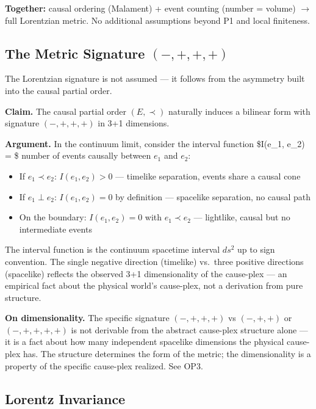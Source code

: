 \documentclass[11pt]{article}
\providecommand{\tightlist}{\setlength{\itemsep}{0pt}\setlength{\parskip}{0pt}}
\theoremstyle{definition}
\theoremstyle{remark}
\begin{document}
\textbf{Together:} causal ordering (Malament) + event counting (number =
volume) \(\to\) full Lorentzian metric. No additional assumptions beyond
P1 and local finiteness.

\subsection{\texorpdfstring{The Metric Signature
\((-,+,+,+)\)}{The Metric Signature (-,+,+,+)}}\label{the-metric-signature--}

The Lorentzian signature is not assumed --- it follows from the
asymmetry built into the causal partial order.

\textbf{Claim.} The causal partial order \((E, \prec)\) naturally
induces a bilinear form with signature \((-,+,+,+)\) in 3+1 dimensions.

\textbf{Argument.} In the continuum limit, consider the interval
function \$I(e\_1, e\_2) = \$ number of events causally between \(e_1\)
and \(e_2\):

\begin{itemize}
\tightlist
\item
  If \(e_1 \prec e_2\): \(I(e_1, e_2) > 0\) --- timelike separation,
  events share a causal cone
\item
  If \(e_1 \perp e_2\): \(I(e_1, e_2) = 0\) by definition --- spacelike
  separation, no causal path
\item
  On the boundary: \(I(e_1, e_2) = 0\) with \(e_1 \prec e_2\) ---
  lightlike, causal but no intermediate events
\end{itemize}

The interval function is the continuum spacetime interval \(ds^2\) up to
sign convention. The single negative direction (timelike) vs.~three
positive directions (spacelike) reflects the observed 3+1 dimensionality
of the cause-plex --- an empirical fact about the physical world's
cause-plex, not a derivation from pure structure.

\textbf{On dimensionality.} The specific signature \((-,+,+,+)\) vs
\((-,+,+)\) or \((-,+,+,+,+)\) is not derivable from the abstract
cause-plex structure alone --- it is a fact about how many independent
spacelike dimensions the physical cause-plex has. The structure
determines the form of the metric; the dimensionality is a property of
the specific cause-plex realized. See OP3.

\subsection{Lorentz Invariance}\label{lorentz-invariance}
\end{document}
